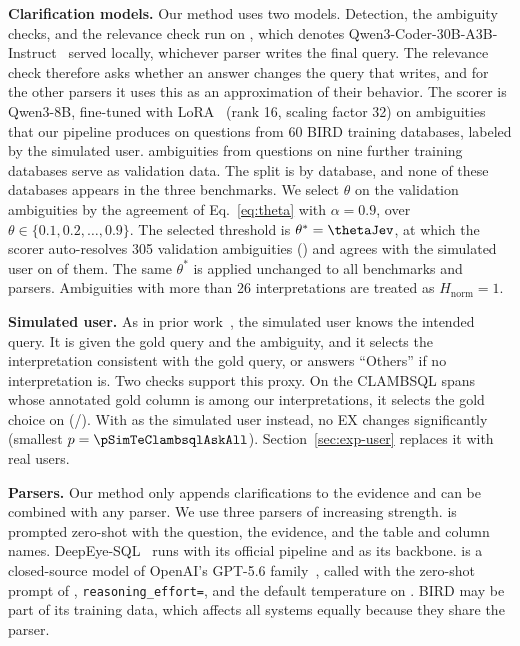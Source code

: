\textbf{Clarification models.} Our method uses two models.
Detection, the ambiguity checks, and the relevance check run on
\coder, which denotes Qwen3-Coder-30B-A3B-Instruct~\cite{qwen3}
served locally, whichever parser writes the final query. The relevance
check therefore asks whether an answer changes the query that \coder{}
writes, and for the other parsers it uses this as an approximation of
their behavior. The scorer is Qwen3-8B, fine-tuned with
LoRA~\cite{lora} (rank 16, scaling factor 32) on \trainCards{}
ambiguities that our pipeline produces on \trainCardQuestions{}
questions from 60 BIRD training databases, labeled by the simulated
user. \valCards{} ambiguities from \valCardQuestions{} questions on
nine further training databases serve as validation data. The split
is by database, and none of these databases appears in the three
benchmarks. We select $\theta$ on the validation ambiguities by the
agreement of Eq.~\eqref{eq:theta} with $\alpha=0.9$, over
$\theta\in\{0.1,0.2,\dots,0.9\}$. The selected threshold is
$\theta^{*}=\thetaJev$, at which the scorer auto-resolves 305
validation ambiguities (\abValAuto) and agrees with the simulated user
on \abValAgree{} of them. The same $\theta^{*}$ is applied unchanged
to all benchmarks and parsers. Ambiguities with more than 26
interpretations are treated as $H_{\mathrm{norm}}=1$.

\textbf{Simulated user.} As in prior
work~\cite{zhang2025clear,xu2026visinteract}, the simulated user knows
the intended query. It is \coder{} given the gold query and the
ambiguity, and it selects the interpretation consistent with the gold
query, or answers ``Others'' if no interpretation is. Two
checks support this proxy. On the \simN{} CLAMBSQL spans whose
annotated gold column is among our interpretations, it selects the
gold choice on \simPct{} (\simHit/\simN). With \terra{} as the
simulated user instead, no EX changes significantly (smallest
$p=\pSimTeClambsqlAskAll$). Section~\ref{sec:exp-user} replaces it
with real users.

\textbf{Parsers.} Our method only appends clarifications to the
evidence and can be combined with any parser. We use three parsers of
increasing strength. \coder{} is prompted zero-shot with the question,
the evidence, and the table and column names. DeepEye-SQL~\cite{deepeye}
runs with its official pipeline and \coder{} as its backbone.
\terra{} is a closed-source model of OpenAI's GPT-5.6
family~\cite{openai2026gpt56}, called with the zero-shot prompt of
\coder, \texttt{reasoning\_effort=\terraEffort}, and the default
temperature on \terraCallDate. BIRD may be part of its training data,
which affects all systems equally because they share the parser.

